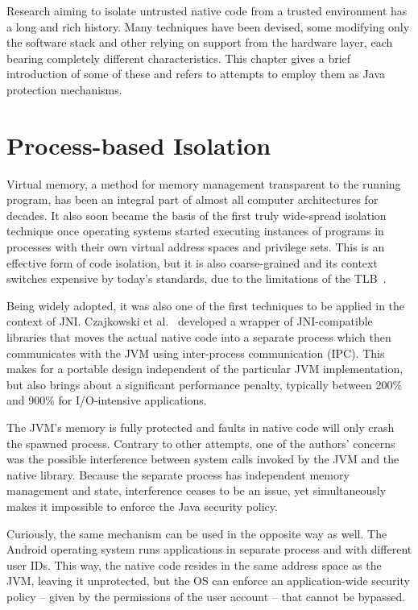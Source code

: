 \documentclass[a4paper,12pt,twoside,openright]{report}
\begin{document}
Research aiming to isolate untrusted native code from a trusted environment has a long and rich history. Many techniques have been devised, some modifying only the software stack and other relying on support from the hardware layer, each bearing completely different characteristics. This chapter gives a brief introduction of some of these and refers to attempts to employ them as Java protection mechanisms.

\section{Process-based Isolation}

Virtual memory, a method for memory management transparent to the running program, has been an integral part of almost all computer architectures for decades. It also soon became the basis of the first truly wide-spread isolation technique once operating systems started executing instances of programs in processes with their own virtual address spaces and privilege sets. This is an effective form of code isolation, but it is also coarse-grained and its context switches expensive by today's standards, due to the limitations of the TLB~\cite{basu2012reducing}. 

Being widely adopted, it was also one of the first techniques to be applied in the context of JNI. Czajkowski et al.~\cite{989483} developed a wrapper of JNI-compatible libraries that moves the actual native code into a separate process which then communicates with the JVM using inter-process communication (IPC). This makes for a portable design independent of the particular JVM implementation, but also brings about a significant performance penalty, typically between 200\% and 900\% for I/O-intensive applications.

The JVM's memory is fully protected and faults in native code will only crash the spawned process. Contrary to other attempts, one of the authors' concerns was the possible interference between system calls invoked by the JVM and the native library. Because the separate process has independent memory management and state, interference ceases to be an issue, yet simultaneously makes it impossible to enforce the Java security policy.

Curiously, the same mechanism can be used in the opposite way as well. The Android operating system runs applications in separate process and with different user IDs. This way, the native code resides in the same address space as the JVM, leaving it unprotected, but the OS can enforce an application-wide security policy -- given by the permissions of the user account -- that cannot be bypassed.
\end{document}
